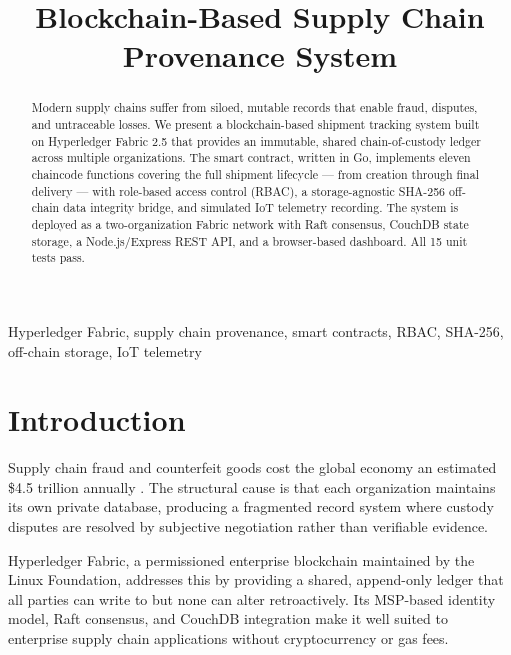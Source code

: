 \documentclass[conference]{IEEEtran}
\begin{document}
\title{Blockchain-Based Supply Chain Provenance System}

\author{
}

\maketitle

\begin{abstract}
Modern supply chains suffer from siloed, mutable records that enable fraud,
disputes, and untraceable losses.  We present a blockchain-based shipment
tracking system built on Hyperledger Fabric 2.5 that provides an immutable,
shared chain-of-custody ledger across multiple organizations.  The smart
contract, written in Go, implements eleven chaincode functions covering the
full shipment lifecycle --- from creation through final delivery --- with
role-based access control (RBAC), a storage-agnostic SHA-256 off-chain data
integrity bridge, and simulated IoT telemetry recording.  The system is
deployed as a two-organization Fabric network with Raft consensus, CouchDB
state storage, a Node.js/Express REST API, and a browser-based dashboard.
All 15 unit tests pass.
\end{abstract}

\begin{IEEEkeywords}
Hyperledger Fabric, supply chain provenance, smart contracts, RBAC,
SHA-256, off-chain storage, IoT telemetry
\end{IEEEkeywords}

\section{Introduction}

Supply chain fraud and counterfeit goods cost the global economy an
estimated \$4.5 trillion annually \cite{shakhbulatov2020}.  The structural
cause is that each organization maintains its own private database, producing
a fragmented record system where custody disputes are resolved by subjective
negotiation rather than verifiable evidence.

Hyperledger Fabric, a permissioned enterprise blockchain maintained by the
Linux Foundation, addresses this by providing a shared, append-only ledger
that all parties can write to but none can alter retroactively.  Its
MSP-based identity model, Raft consensus, and CouchDB integration make it
well suited to enterprise supply chain applications without cryptocurrency
or gas fees.
\end{document}
